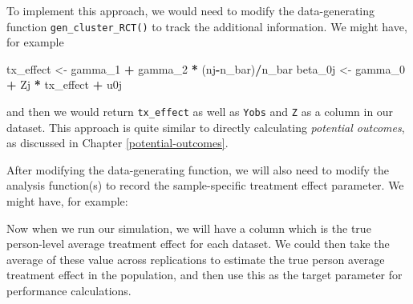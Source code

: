 \documentclass[
]{book}
\newenvironment{Shaded}{\begin{snugshade}}{\end{snugshade}}
\newcommand{\AttributeTok}[1]{\textcolor[rgb]{0.13,0.29,0.53}{#1}}
\newcommand{\ControlFlowTok}[1]{\textcolor[rgb]{0.13,0.29,0.53}{\textbf{#1}}}
\newcommand{\FunctionTok}[1]{\textcolor[rgb]{0.13,0.29,0.53}{\textbf{#1}}}
\newcommand{\NormalTok}[1]{#1}
\newcommand{\OtherTok}[1]{\textcolor[rgb]{0.56,0.35,0.01}{#1}}
\newcommand{\SpecialCharTok}[1]{\textcolor[rgb]{0.81,0.36,0.00}{\textbf{#1}}}
\newcommand{\StringTok}[1]{\textcolor[rgb]{0.31,0.60,0.02}{#1}}
\begin{document}
To implement this approach, we would need to modify the data-generating function \texttt{gen\_cluster\_RCT()} to track the additional information.
We might have, for example

\begin{Shaded}
\begin{Highlighting}[]
\NormalTok{tx\_effect }\OtherTok{\textless{}{-}}\NormalTok{ gamma\_1 }\SpecialCharTok{+}\NormalTok{ gamma\_2 }\SpecialCharTok{*}\NormalTok{ (nj}\SpecialCharTok{{-}}\NormalTok{n\_bar)}\SpecialCharTok{/}\NormalTok{n\_bar}
\NormalTok{beta\_0j }\OtherTok{\textless{}{-}}\NormalTok{ gamma\_0 }\SpecialCharTok{+}\NormalTok{ Zj }\SpecialCharTok{*}\NormalTok{ tx\_effect }\SpecialCharTok{+}\NormalTok{ u0j}
\end{Highlighting}
\end{Shaded}

and then we would return \texttt{tx\_effect} as well as \texttt{Yobs} and \texttt{Z} as a column in our dataset.
This approach is quite similar to directly calculating \emph{potential outcomes}, as discussed in Chapter \ref{potential-outcomes}.

After modifying the data-generating function, we will also need to modify the analysis function(s) to record the sample-specific treatment effect parameter.
We might have, for example:

\begin{Shaded}
\end{Shaded}

Now when we run our simulation, we will have a column which is the true person-level average treatment effect for each dataset.
We could then take the average of these value across replications to estimate the true person average treatment effect in the population, and then use this as the target parameter for performance calculations.
\end{document}
